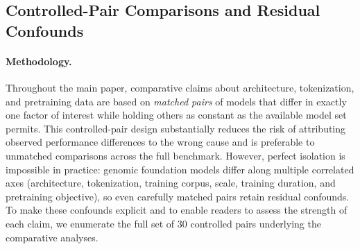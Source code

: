 \documentclass{article}
\theoremstyle{plain}
\theoremstyle{definition}
\theoremstyle{remark}
\begin{document}
\subsection{Controlled-Pair Comparisons and Residual Confounds}
\label{subsec:controlled_pairs}

\paragraph{Methodology.}
Throughout the main paper, comparative claims about architecture,
tokenization, and pretraining data are based on \emph{matched pairs} of
models that differ in exactly one factor of interest while holding others
as constant as the available model set permits. This controlled-pair
design substantially reduces the risk of attributing observed performance
differences to the wrong cause and is preferable to unmatched comparisons
across the full benchmark. However, perfect isolation is impossible in
practice: genomic foundation models differ along multiple correlated
axes (architecture, tokenization, training corpus, scale, training
duration, and pretraining objective), so even carefully matched pairs
retain residual confounds. To make these confounds explicit and to enable
readers to assess the strength of each claim, we enumerate the full set
of $30$ controlled pairs underlying the comparative analyses.
\end{document}

